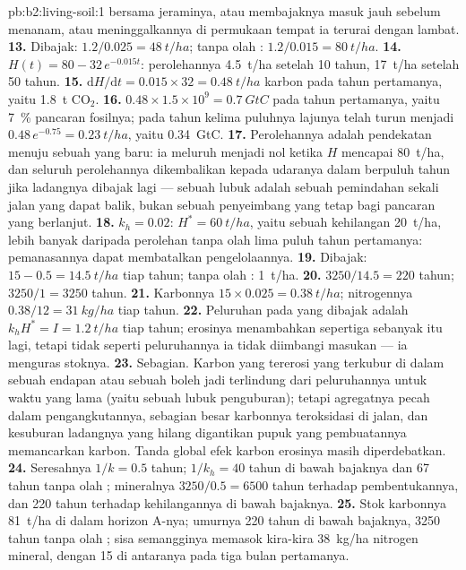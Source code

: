 \begin{solution}{pb:b2:living-soil:1}
bersama jeraminya, atau membajaknya masuk jauh sebelum menanam, atau
meninggalkannya di permukaan tempat ia terurai dengan lambat.
\textbf{13.} Dibajak: $1.2/0.025 = \qty{48}{t/ha}$; tanpa olah :
$1.2/0.015 = \qty{80}{t/ha}$.
\textbf{14.} $H(t) = 80 - 32\,e^{-0.015t}$: perolehannya \qty{4.5}{t/ha}
setelah 10 tahun, \qty{17}{t/ha} setelah 50 tahun.
\textbf{15.} $\mathrm{d}H/\mathrm{d}t = 0.015\times 32 =
\qty{0.48}{t/ha}$ karbon pada tahun pertamanya, yaitu \qty{1.8}{t}
$\mathrm{CO_2}$.
\textbf{16.} $0.48\times 1.5\times 10^{9} = \qty{0.7}{GtC}$ pada tahun
pertamanya, yaitu \qty{7}{\%} pancaran fosilnya; pada tahun kelima
puluhnya lajunya telah turun menjadi $0.48\,e^{-0.75} = \qty{0.23}{t/ha}$,
yaitu \qty{0.34}{GtC}.
\textbf{17.} Perolehannya adalah pendekatan menuju sebuah 
yang baru: ia meluruh menjadi nol ketika $H$ mencapai \qty{80}{t/ha},
dan seluruh perolehannya dikembalikan kepada udaranya dalam berpuluh
tahun jika ladangnya dibajak lagi --- sebuah lubuk  adalah sebuah
pemindahan sekali jalan yang dapat balik, bukan sebuah penyeimbang yang
tetap bagi pancaran yang berlanjut.
\textbf{18.} $k_h = 0.02$: $H^{*} = \qty{60}{t/ha}$, yaitu sebuah
kehilangan \qty{20}{t/ha}, lebih banyak daripada perolehan tanpa olah
 lima puluh tahun pertamanya: pemanasannya dapat membatalkan
pengelolaannya.
\textbf{19.} Dibajak: $15 - 0.5 = \qty{14.5}{t/ha}$ tiap tahun; tanpa
olah : \qty{1}{t/ha}.
\textbf{20.} $3250/14.5 = 220$ tahun; $3250/1 = 3250$ tahun.
\textbf{21.} Karbonnya $15\times 0.025 = \qty{0.38}{t/ha}$; nitrogennya
$0.38/12 = \qty{31}{kg/ha}$ tiap tahun.
\textbf{22.} Peluruhan  pada  yang dibajak adalah
$k_hH^{*} =
I = \qty{1.2}{t/ha}$ tiap tahun; erosinya menambahkan
sepertiga sebanyak itu lagi, tetapi tidak seperti peluruhannya ia tidak
diimbangi masukan --- ia menguras stoknya.
\textbf{23.} Sebagian. Karbon yang tererosi yang terkubur di dalam
sebuah endapan atau sebuah  boleh jadi terlindung dari
peluruhannya untuk waktu yang lama (yaitu sebuah lubuk penguburan);
tetapi agregatnya pecah dalam pengangkutannya, sebagian besar karbonnya
teroksidasi di jalan, dan kesuburan ladangnya yang hilang digantikan
pupuk yang pembuatannya memancarkan karbon. Tanda global efek karbon
erosinya masih diperdebatkan.
\textbf{24.} Seresahnya $1/k = 0.5$ tahun;  $1/k_h = 40$ tahun
di bawah bajaknya dan 67 tahun tanpa olah ;  mineralnya
$3250/0.5 =
6500$ tahun terhadap pembentukannya, dan 220 tahun terhadap
kehilangannya di bawah bajaknya.
\textbf{25.} Stok karbonnya \qty{81}{t/ha} di dalam horizon A-nya;
umurnya 220 tahun di bawah bajaknya, 3250 tahun tanpa olah ;
sisa semangginya memasok kira-kira \qty{38}{kg/ha} nitrogen mineral,
dengan 15 di antaranya pada tiga bulan pertamanya.
\end{solution}

